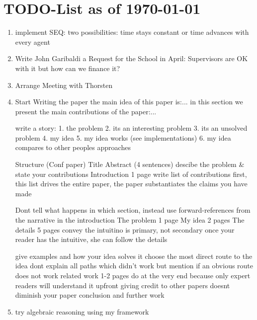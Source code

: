 \section{TODO-List as of \today}

\begin{enumerate}
\item implement SEQ: two possibilities: time stays constant or time advances with every agent

\item Write John Garibaldi a Request for the School in April: Supervisors are OK with it but how can we finance it?

\item Arrange Meeting with Thorsten

\item Start Writing the paper
the main idea of this paper is:...
in this section we present the main contributions of the paper:...

write a story:
	1. the problem
	2. its an interesting problem
	3. its an unsolved problem
	4. my idea
	5. my idea works (see implementations)
	6. my idea compares to other peoples approaches
	
Structure (Conf paper)
	Title
	Abstract (4 sentences)
		descibe the problem & state your contributions
	Introduction 1 page
		write list of contributions first,
		this list drives the entire paper,
		the paper substantiates the claims you have made
		
		Dont tell what happens in which section,
		instead use forward-references from the
		narrative in the introduction
	The problem 1 page
	My idea 2 pages
	The details 5 pages
		convey the intuitino is primary, not secondary
		once your reader has the intuitive, she can follow the details
		
		give examples and how your idea solves it
		choose the most direct route to the idea
			dont explain all paths which didn't work
			but mention if an obvious route does not work
	related work 1-2 pages
		do at the very end because only expert readers will understand it upfront
		giving credit to other papers doesnt diminish your paper
	conclusion and further work

\item try algebraic reasoning using my framework


\end{enumerate}
